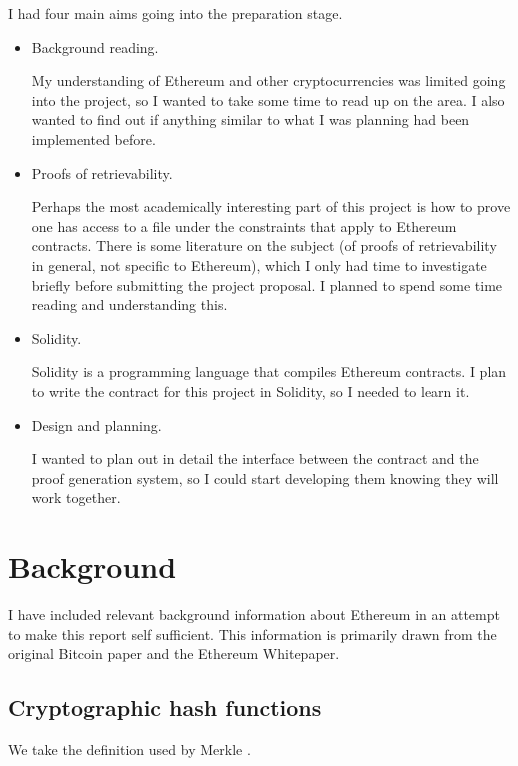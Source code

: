 \documentclass[12pt,a4paper,twoside,openright]{report}
\begin{document}
I had four main aims going into the preparation stage.
\begin{itemize}
\item Background reading.

My understanding of Ethereum and other cryptocurrencies was limited going into the project, so I wanted to
take some time to read up on the area. I also wanted to find out if anything similar to what I was planning
had been implemented before.

\item Proofs of retrievability.

Perhaps the most academically interesting part of this project is how to prove one has access to a file
under the constraints that apply to Ethereum contracts.
There is some literature on the subject (of proofs of retrievability in general, not specific to Ethereum),
which I only had time to investigate briefly before submitting the project proposal.
I planned to spend some time reading and understanding this.

\item Solidity.

Solidity is a programming language that compiles Ethereum contracts.
I plan to write the contract for this project in Solidity, so I needed to learn it.

\item Design and planning.

I wanted to plan out in detail the interface between the contract and the proof generation system,
so I could start developing them knowing they will work together.


\end{itemize}


\section{Background}

I have included relevant background information about Ethereum in an attempt to make this report self sufficient.
This information is primarily drawn from the original Bitcoin paper\cite{bitcoin-whitepaper} and the Ethereum Whitepaper\cite{eth-whitepaper}.

\subsection{Cryptographic hash functions} \label{crypto-hash}

We take the definition used by Merkle \cite{merkle-thesis}.
\end{document}
